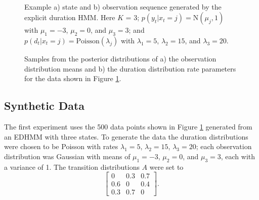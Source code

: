 
\begin{figure}
     \\
    \caption{Example a) state and b) observation sequence generated by the explicit duration HMM. Here $K$ = 3; $p(y_t|x_t=j) = \mathrm{N}(\mu_j, 1)$ with $\mu_1 = -3$, $\mu_2 = 0$, and $\mu_3 = 3$; and $p(d_t|x_t=j) = \mathrm{Poisson}(\lambda_j)$ with $\lambda_1 = 5$, $\lambda_2 = 15$, and $\lambda_3 = 20$.}
    \label{fig:experiment1_data}
\end{figure}

\begin{figure}
    \caption{Samples from the posterior distributions of a) the observation distribution means and b) the duration distribution rate parameters for the data shown in Figure \ref{fig:experiment1_data}.}
    \label{fig:experiment1_results}
\end{figure}
\subsection{Synthetic Data}

The first experiment uses the 500 data points shown in Figure \ref{fig:experiment1_data} generated from an EDHMM with three states. To generate the data the duration distributions were chosen to be Poisson with rates $\lambda_1 = 5$, $\lambda_2 = 15$, $\lambda_3 = 20$; each observation distribution was Gaussian with means of $\mu_1 = -3$, $\mu_2 = 0$, and $\mu_3 = 3$, each with a variance of 1. The transition distributions $A$ were set to
\begin{equation*}
\begin{bmatrix}
    0 & 0.3 & 0.7 \\ 0.6 & 0 & 0.4 \\ 0.3 & 0.7 & 0
\end{bmatrix}.  
\end{equation*}



